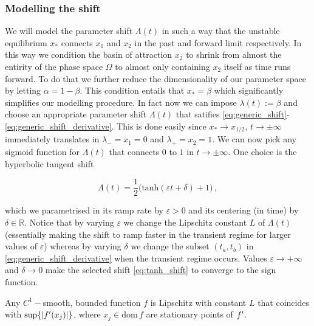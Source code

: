 \documentclass[../main.tex]{subfiles}
\begin{document}
\subsubsection{Modelling the shift}\label{subsubsec:modelling}

We will model the parameter shift $\Lambda(t)$ in such a way that the unstable equilibrium $x_{*}$ connects $x_{1}$ and $x_{2}$ in the past and forward limit respectively.
In this way we condition the basin of attraction $x_{2}$ to shrink from almost the entirity of the phase space $\Omega$ to almost only containing $x_{2}$ itself as time runs forward.
To do that we further reduce the dimensionality of our parameter space by letting $\alpha=1-\beta$.
This condition entails that $x_{*}=\beta$ which significantly simplifies our modelling procedure.
In fact now we can impose $\lambda(t):=\beta$ and choose an appropriate parameter shift $\Lambda(t)$ that satifies \eqref{eq:generic_shift}-\eqref{eq:generic_shift_derivative}.
This is done easily since $x_{*}\to x_{1/2}$, $t\to\pm\infty$ immediately translates in $\lambda_{-}=x_{1}=0$ and $\lambda_{+}=x_{2}=1$.
We can now pick any sigmoid function for $\Lambda(t)$ that connects $0$ to $1$ in $t\to\pm\infty$.
One choice is the hyperbolic tangent shift 

\begin{equation}\label{eq:tanh_shift}
     \Lambda(t) = \frac{1}{2}\big(\text{tanh}(\varepsilon t + \delta) + 1\big)\,, 
\end{equation}

which we parametrised in its ramp rate by $\varepsilon>0$ and its centering (in time) by $\delta\in \mathbb{R}$. 
Notice that by varying $\varepsilon$ we change the Lipschitz constant $L$ of $\Lambda(t)$ (essentially making the shift to ramp faster in the transient regime for larger values of $\varepsilon$) whereas by varying $\delta$ we change the subset $(t_{a}, t_{b})$ in \eqref{eq:generic_shift_derivative} when the transient regime occurs. 
Values $\varepsilon\to+\infty$ and $\delta\to0$ make the selected shift \eqref{eq:tanh_shift} to converge to the sign function. 

\begin{remark*}
     Any $C^{1}-$smooth, bounded function $f$ is Lipschitz with constant $L$ that coincides with $\sup\{|f'(x_{j})|\}$, where $x_{j}\in\text{dom}\,f$ are stationary points of $f'$.
\end{remark*}
\end{document}
